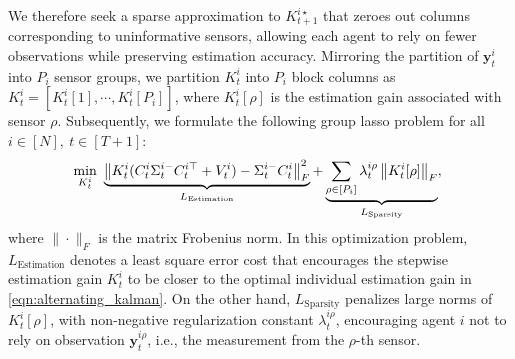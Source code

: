 \documentclass[letterpaper, 10 pt, conference]{ieeeconf}  %
\begin{document}
We therefore seek a sparse approximation to $K_{t+1}^{i\star}$ that zeroes out columns corresponding to uninformative sensors, allowing each agent to rely on fewer observations while preserving estimation accuracy. Mirroring the partition of $\textbf{y}_t^i$ into $P_i$ sensor groups, we partition $K_t^i$ into $P_i$ block columns as $K_t^i=[K_t^i[1],\cdots,K_t^i[P_i]]$, where $K_t^i[\rho]$ is the estimation gain associated with sensor $\rho$. Subsequently, we formulate the following group lasso problem for all $i\in[N],\ t\in[T+1]$:
\begin{equation}
        \hspace{-1mm}\min_{K_t^i}\ \underbrace{\left\|K_t^i(C_t^i\Sigma_t^{i-}C_t^{i\top}+V_t^i)-\Sigma_t^{i-}C_t^i\right\|_F^2}_{L_{\text{Estimation}}}+\underbrace{\sum_{\rho\in[P_i]}\lambda_t^{i\rho}\left\|K_t^i[\rho]\right\|_F}_{L_{\text{Sparsity}}},
    \label{eqn:lasso_sparse_estimation}
\end{equation}
where $\|\cdot\|_F$ is the matrix Frobenius norm. In this optimization problem, $L_{\text{Estimation}}$ denotes a least square error cost that encourages the stepwise estimation gain $K_t^i$ to be closer to the optimal individual estimation gain in \eqref{eqn:alternating_kalman}. On the other hand, $L_{\text{Sparsity}}$ penalizes large norms of $K_t^i[\rho]$, with non-negative regularization constant $\lambda_t^{i\rho}$, encouraging agent $i$ not to rely on observation $\textbf{y}_t^{i\rho}$, i.e., the measurement from the $\rho$-th sensor. 
\end{document}

